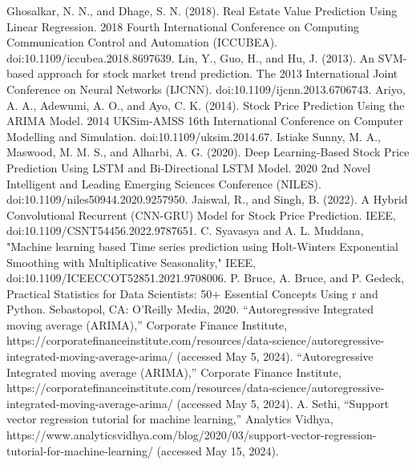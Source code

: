 \documentclass{ieeeojies}
\begin{document}
\begin{thebibliography}{00}
 Ghosalkar, N. N., and Dhage, S. N. (2018). Real Estate Value Prediction Using Linear Regression. 2018 Fourth International Conference on Computing Communication Control and Automation (ICCUBEA). doi:10.1109/iccubea.2018.8697639.
 Lin, Y., Guo, H., and Hu, J. (2013). An SVM-based approach for stock market trend prediction. The 2013 International Joint Conference on Neural Networks (IJCNN). doi:10.1109/ijcnn.2013.6706743.
 Ariyo, A. A., Adewumi, A. O., and Ayo, C. K. (2014). Stock Price Prediction Using the ARIMA Model. 2014 UKSim-AMSS 16th International Conference on Computer Modelling and Simulation. doi:10.1109/uksim.2014.67.
 Istiake Sunny, M. A., Maswood, M. M. S., and Alharbi, A. G. (2020). Deep Learning-Based Stock Price Prediction Using LSTM and Bi-Directional LSTM Model. 2020 2nd Novel Intelligent and Leading Emerging Sciences Conference (NILES). doi:10.1109/niles50944.2020.9257950.
 Jaiswal, R., and Singh, B. (2022). A Hybrid Convolutional Recurrent (CNN-GRU) Model for Stock Price Prediction. IEEE, doi:10.1109/CSNT54456.2022.9787651.
 C. Syavasya and A. L. Muddana, "Machine learning based Time series prediction using Holt-Winters Exponential Smoothing with Multiplicative Seasonality," IEEE, doi:10.1109/ICEECCOT52851.2021.9708006.
 P. Bruce, A. Bruce, and P. Gedeck, Practical Statistics for Data Scientists: 50+ Essential Concepts Using r and Python. Sebastopol, CA: O’Reilly Media, 2020. 
 “Autoregressive Integrated moving average (ARIMA),” Corporate Finance Institute, https://corporatefinanceinstitute.com/resources/data-science/autoregressive-integrated-moving-average-arima/ (accessed May 5, 2024). 
 “Autoregressive Integrated moving average (ARIMA),” Corporate Finance Institute, https://corporatefinanceinstitute.com/resources/data-science/autoregressive-integrated-moving-average-arima/ (accessed May 5, 2024).
 A. Sethi, “Support vector regression tutorial for machine learning,” Analytics Vidhya, https://www.analyticsvidhya.com/blog/2020/03/support-vector-regression-tutorial-for-machine-learning/ (accessed May 15, 2024). 

\end{thebibliography}

\EOD
\end{document}
